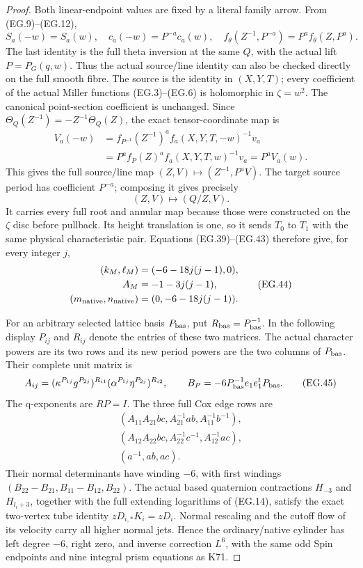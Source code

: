 \begin{proof}
Both linear-endpoint values are
fixed by a literal family arrow.
From (EG.9)--(EG.12),
\[
 S_a(-w)=S_a(w),\quad
 c_a(-w)=P^{-a}c_a(w),\quad
 f_\theta(Z^{-1},P^{-a})
                  =P^a f_\theta(Z,P^a).
 \tag{EG.42}
\]
The last identity is the full
theta inversion at the same
\(Q\), with the actual lift
\(P=P_G(q,w)\). Thus the actual
source/line identity can also be checked directly on the full smooth
fibre. The source is the identity in \((X,Y,T)\); every coefficient
of the actual Miller functions (EG.3)--(EG.6) is holomorphic in
\(\zeta=w^2\). The canonical point-section coefficient is unchanged.
Since
\(\Theta_Q(Z^{-1})=-Z^{-1}\Theta_Q(Z)\), the exact tensor-coordinate
map is
\[
 \begin{split}
 V_a(-w)
 &=f_{P^{-1}}(Z^{-1})^a f_a(X,Y,T,-w)^{-1}v_a\\
 &=P^a f_P(Z)^a f_a(X,Y,T,w)^{-1}v_a
  =P^a V_a(w).
 \end{split}
 \tag{EG.42a}
\]
This gives the full source/line map
\((Z,V)\mapsto(Z^{-1},P^aV)\).
The target source period has
coefficient \(P^{-a}\); composing
it gives precisely
\[
 (Z,V)\longmapsto(Q/Z,V).
 \tag{EG.43}
\]
It carries every full root and
annular map because those were
constructed on the \(\zeta\)
disc before pullback. Its height
translation is one, so it sends
\(T_0\) to \(T_1\) with the
same physical characteristic
pair. Equations (EG.39)--(EG.43)
therefore give, for every integer
\(j\),
\[
 \begin{aligned}
 (k_M,\ell_M)&=(-6-18j(j-1),0),\\
 A_M&=-1-3j(j-1),\\
 (m_{\rm native},n_{\rm native})&=(0,-6-18j(j-1)).
 \end{aligned}
 \tag{EG.44}
\]

For an arbitrary selected lattice
basis \(P_{\rm bas}\), put
\(R_{\rm bas}=P_{\rm bas}^{-1}\).
In the following display \(P_{ij}\) and \(R_{ij}\) denote the
entries of these two matrices.
The actual character powers are
its two rows and its new period
powers are the two columns of
\(P_{\rm bas}\). Their complete
unit matrix is
\[
 A_{ij}=
 (\kappa^{P_{1j}}g^{P_{2j}})^{R_{i1}}
 (\alpha^{P_{1j}}\eta^{P_{2j}})^{R_{i2}},
 \qquad
 B_P=-6P_{\rm bas}^{-1}e_1e_1^tP_{\rm bas}.
 \tag{EG.45}
\]
The q-exponents are \(RP=I\).
The three full Cox edge rows are
\[
 \begin{gathered}
 (A_{11}A_{21}bc,A_{21}^{-1}ab,A_{11}^{-1}b^{-1}),\\
 (A_{12}A_{22}bc,A_{22}^{-1}c^{-1},A_{12}^{-1}ac),\\
 (a^{-1},ab,ac).
 \end{gathered}
 \tag{EG.46}
\]
Their normal determinants have
winding \(-6\), with first
windings
\((B_{22}-B_{21},B_{11}-B_{12},B_{22})\).
The actual based quaternion
contractions \(H_{-3}\) and
\(H_{l_i+3}\), together with the
full extending logarithms of
(EG.14), satisfy the exact
two-vertex tube identity
\(zD_{i,*}K_i=zD_i\).
Normal rescaling and the cutoff
flow of its velocity carry all
higher normal jets. Hence the
ordinary/native cylinder has
left degree \(-6\), right zero,
and inverse correction \(L^6\),
with the same odd Spin
endpoints and nine integral
prism equations as K71.


\end{proof}
